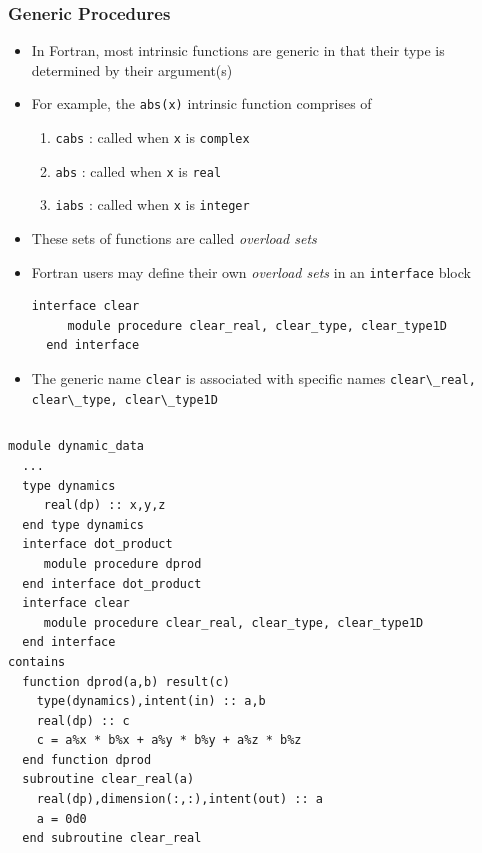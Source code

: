 \documentclass[c,mathserif,compress,xcolor=svgnames]{beamer}
\newcommand{\lstfortran}[1]{\lstinline[language={[90]Fortran},basicstyle=\footnotesize\ttfamily]|#1|}
\newenvironment{eblock}[0]
{
\begin{beamerboxesrounded}[upper=uppercol2,lower=lowercol2,shadow=true]}
{\end{beamerboxesrounded}}
\begin{document}
\begin{frame}
  \frametitle{\small Generic Procedures}
  \begin{itemize}
    \item In Fortran, most intrinsic functions are generic in that their type is determined by their argument(s)
    \item For example, the \lstfortran{abs(x)} intrinsic function comprises of
    \begin{enumerate}
      \item \lstfortran{cabs} : called when \lstfortran{x} is \lstfortran{complex}
      \item \lstfortran{abs} : called when \lstfortran{x} is \lstfortran{real}
      \item \lstfortran{iabs} : called when \lstfortran{x} is \lstfortran{integer}
    \end{enumerate}
    \item These sets of functions are called \textit{overload sets}
    \item Fortran users may define their own \textit{overload sets} in an \lstfortran{interface} block
      \begin{lstlisting}[language={[90]Fortran},basicstyle=\fontsize{5}{6}\selectfont\ttfamily]
  interface clear
     module procedure clear_real, clear_type, clear_type1D
  end interface
      \end{lstlisting}
    \item The generic name \lstfortran{clear} is associated with specific names \lstfortran{clear\_real, clear\_type, clear\_type1D}
  \end{itemize}
  \framebreak
  {\fontsize{4}{5}
    \begin{columns}[t]
      \column{5cm}
      \vspace{-0.5cm}
      \begin{eblock}{}
        \begin{lstlisting}[language={[90]Fortran},basicstyle=\fontsize{5}{6}\selectfont\ttfamily]
module dynamic_data
  ...
  type dynamics
     real(dp) :: x,y,z
  end type dynamics
  interface dot_product
     module procedure dprod
  end interface dot_product
  interface clear
     module procedure clear_real, clear_type, clear_type1D
  end interface
contains
  function dprod(a,b) result(c)
    type(dynamics),intent(in) :: a,b
    real(dp) :: c
    c = a%x * b%x + a%y * b%y + a%z * b%z
  end function dprod
  subroutine clear_real(a)
    real(dp),dimension(:,:),intent(out) :: a
    a = 0d0
  end subroutine clear_real


\end{lstlisting}
\end{eblock}
\end{columns}}
\end{frame}
\end{document}
